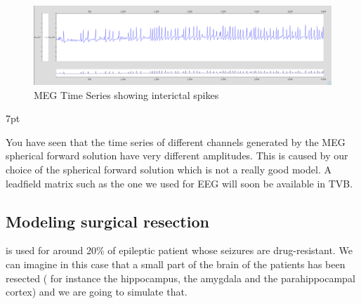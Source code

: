 \documentclass{tufte-handout}
\newenvironment{blah}{%
  \def\FrameCommand{%
    \hspace{1pt}%
    {\color{DarkOrange}\vrule width 2pt}%
    {\color{PeachPuff}\vrule width 4pt}%
    \colorbox{PeachPuff}%
  }%
  \MakeFramed{\advance\hsize-\width\FrameRestore}%
  \noindent\hspace{-4.55pt}%
  \begin{adjustwidth}{}{7pt}%
  \vspace{2pt}\vspace{2pt}%
}
{%
  \vspace{2pt}\end{adjustwidth}\endMakeFramed%
}
\begin{document}
\begin{figure}[h]
  \includegraphics[width=\linewidth]{Handout_UI_ModellingAnEpilepticPatient_MEGTimeSeries}%
  \caption{MEG Time Series showing interictal spikes}%
  \label{fig:ts_meg}%
\end{figure}

\begin{blah}
You have seen that the time series of different channels generated by the MEG spherical forward solution have very different amplitudes. This is caused
by our choice of the spherical forward solution which is not a really good model. A leadfield matrix such as the one we used for EEG
will soon be available in TVB.
\end{blah}

\subsection{Modeling surgical resection}

 is used for around 20\% of epileptic patient whose seizures are drug-resistant. We can imagine in this case that a small part of the brain of the patients 
has been resected ( for instance the hippocampus, the amygdala and the parahippocampal cortex) and 
we are going to simulate that.
\end{document}
